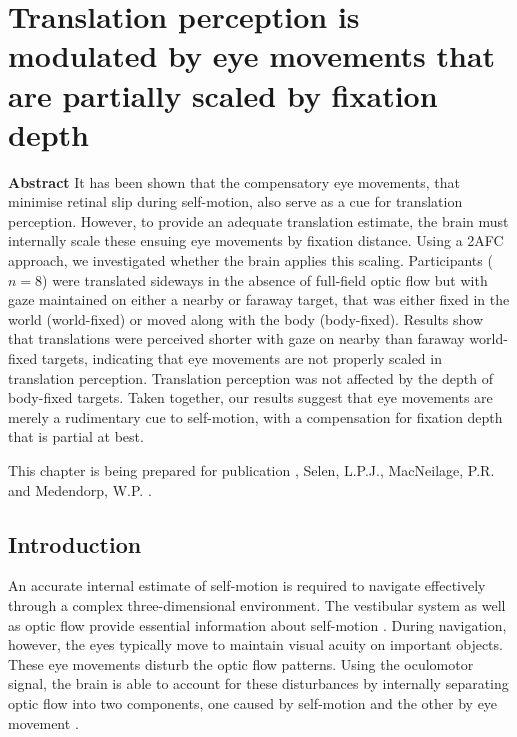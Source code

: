 
\chapter{Translation perception is modulated by eye movements that are partially scaled by fixation depth}
\chaptermark{}

\label{p4}

\newpage

\small {\bf Abstract}
It has been shown that the compensatory eye movements, that minimise retinal slip during self-motion, also serve as a cue for translation perception. However, to provide an adequate translation estimate, the brain must internally scale these ensuing eye movements by fixation distance. Using a 2AFC approach, we investigated whether the brain applies this scaling.  Participants ($n = 8$) were translated sideways in the absence of full-field optic flow but with gaze maintained on either a nearby or faraway target, that was either fixed in the world (world-fixed) or moved along with the body (body-fixed). Results show that translations were perceived shorter with gaze on nearby than faraway world-fixed targets, indicating that eye movements are not properly scaled in translation perception. Translation perception was not affected by the depth of body-fixed targets. Taken together, our results suggest that eye movements are merely a rudimentary cue to self-motion, with a compensation for fixation depth that is partial at best.

\vfill

\noindent\underline{ \hspace{4cm} }

\noindent This chapter is being prepared for publication \newline
{}, Selen, L.P.J., MacNeilage, P.R. and Medendorp, W.P. \citeyear{clemens2015b}. %

\newpage




\section{Introduction}

An accurate internal estimate of self-motion is required to navigate effectively through a complex three-dimensional environment. The vestibular system as well as optic flow provide essential information about self-motion \cite{gibson1955, benson1986, harris2000, israel1989, angelaki2005, carriot2013, chen2010}. During navigation, however, the eyes typically move to maintain visual acuity on important objects. These eye movements disturb the optic flow patterns. Using the oculomotor signal, the brain is able to account for these disturbances by internally separating optic flow into two components, one caused by self-motion and the other by eye movement \cite{warren1988, royden1992, freeman1998, lappe1999}.


